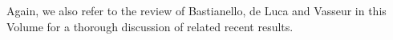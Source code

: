 \documentclass[onecolumn,amsfonts,showpacs,superscriptaddress]{revtex4-1}
\begin{document}
Again, we also refer to the review of Bastianello, de Luca and Vasseur in this Volume for a thorough discussion of related recent results.



\end{document}

